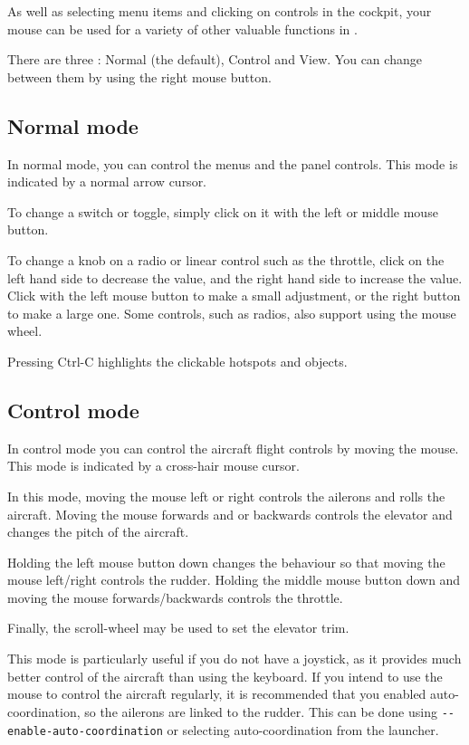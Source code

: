 As well as selecting menu items and clicking on controls in the cockpit, your
mouse can be used for a variety of other valuable functions in \FlightGear{}.

There are three : Normal (the default), Control and View. You can
change between them by using the right mouse button.

\subsection{Normal mode}

In normal mode, you can control the menus and the panel controls. This mode is indicated by
a normal arrow cursor.

To change a switch or toggle, simply click on it with the left or middle mouse button.

To change a knob on a radio or linear control such as the throttle, click on the left
hand side to decrease the value, and the right hand side to increase the value. Click
with the left mouse button to make a small adjustment, or the right button to make a
large one. Some controls, such as radios, also support using the mouse wheel.

Pressing Ctrl-C highlights the clickable hotspots and objects.

\subsection{Control mode}

In control mode you can control the aircraft flight controls by moving the mouse.
This mode is indicated by a cross-hair mouse cursor.

In this mode, moving the mouse left or right controls the ailerons and rolls the
aircraft. Moving the mouse forwards and or backwards controls the elevator and
changes the pitch of the aircraft.

Holding the left mouse button down changes the behaviour so that moving the
mouse left/right controls the rudder. Holding the middle mouse button down and
moving the mouse forwards/backwards controls the throttle.

Finally, the scroll-wheel may be used to set the elevator trim.

This mode is particularly useful if you do not have a joystick, as it provides much better
control of the aircraft than using the keyboard. If you intend to use the mouse to control
the aircraft regularly, it is recommended that you enabled auto-coordination, so the
ailerons are linked to the rudder. This can be done using \texttt{-$ $-enable-auto-coordination}
or selecting auto-coordination from the launcher.

